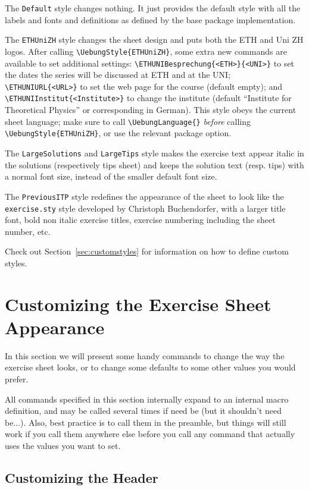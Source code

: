 \documentclass[11pt,a4paper]{article}
\begin{document}
The \texttt{Default} style changes nothing. It just provides the default style with all
the labels and fonts and definitions as defined by the base package implementation.

The \texttt{ETHUniZH} style changes the sheet design and puts both the ETH and Uni ZH
logos. After calling \verb|\UebungStyle{ETHUniZH}|, some extra new commands are available
to set additional settings: \verb|\ETHUNIBesprechung{<ETH>}{<UNI>}| to set the dates the
series will be discussed at ETH and at the UNI; \verb|\ETHUNIURL{<URL>}| to set the web
page for the course (default empty); and \verb|\ETHUNIInstitut{<Institute>}| to change the
institute (default ``Institute for Theoretical Physics'' or corresponding in German). This
style obeys the current sheet language; make sure to call \verb|\UebungLanguage{}|
\emph{before} calling \verb|\UebungStyle{ETHUniZH}|, or use the relevant package option.

The \texttt{LargeSolutions} and \texttt{LargeTips} style makes the exercise text appear
italic in the solutions (respectively tips sheet) and keeps the solution text (resp. tips)
with a normal font size, instead of the smaller default font size.

The \texttt{PreviousITP} style redefines the appearance of the sheet to look like the
\texttt{exercise.sty} style developed by Christoph Buchendorfer, with a larger title font,
bold non italic exercise titles, exercise numbering including the sheet number, etc.

Check out Section~\ref{sec:customstyles} for information on how to define custom styles.

\section{Customizing the Exercise Sheet Appearance}
\label{sec:CustomizeSheet}

In this section we will present some handy commands to change the way the exercise sheet
looks, or to change some defaults to some other values you would prefer.

All  commands specified in this section internally expand to
an internal macro definition, and may be called several times if need be (but it shouldn't
need be...). Also, best practice is to call them in the preamble, but things will still
work if you call them anywhere else before you call any command that actually uses the
values you want to set.

\subsection{Customizing the Header}
\label{sec:CustomHeader}
\end{document}
